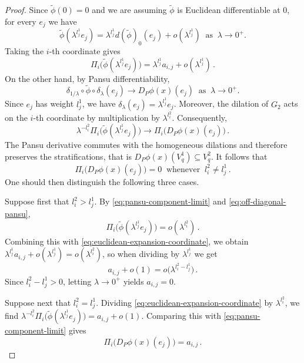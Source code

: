 \documentclass[dvipsnames]{amsart}
\theoremstyle{definition}
\theoremstyle{definition}
\numberwithin{equation}{section}
\begin{document}
\begin{proof}
Since $\widetilde\phi(0)=0$ and we are assuming \(\widetilde\phi\) is Euclidean differentiable at \(0\), for every
\(e_j\) we have
\[
\widetilde\phi(\lambda^{l_j^1}e_j)
=
\lambda^{l_j^1}d(\widetilde\phi)_0(e_j)
+
o(\lambda^{l_j^1})
\ \text{ as }\ \lambda\to0^+.
\]
Taking the \(i\)-th coordinate gives
\begin{equation}
\label{eq:euclidean-expansion-coordinate}
\Pi_i\bigl(\widetilde\phi(\lambda^{l_j^1}e_j)\bigr)
=
\lambda^{l_j^1}a_{i,j}
+
o(\lambda^{l_j^1})\,.
\end{equation}
On the other hand, by Pansu differentiability,
\[
\delta_{1/\lambda}\circ\widetilde\phi\circ\delta_\lambda(e_j)
\longrightarrow
D_P\phi(x)(e_j)\ 
\text{ as }\ \lambda\to0^+.
\]
Since \(e_j\) has weight \(l_j^1\), we have $\delta_\lambda(e_j)=\lambda^{l_j^1}e_j$.
Moreover, the dilation of \(G_2\) acts on the \(i\)-th coordinate by
multiplication by \(\lambda^{l_i^2}\). Consequently,
\begin{equation}
\label{eq:pansu-component-limit}
\lambda^{-l_i^2}
\Pi_i\bigl(\widetilde\phi(\lambda^{l_j^1}e_j)\bigr)
\longrightarrow
\Pi_i\bigl(D_P\phi(x)(e_j)\bigr)\,.
\end{equation}
The Pansu derivative commutes with the homogeneous dilations and
therefore preserves the stratifications, that is $D_P\phi(x)(V_q^1)\subseteq V_q^2$.
It follows that
\begin{equation}
\label{eq:off-diagonal-pansu}
\Pi_i\bigl(D_P\phi(x)(e_j)\bigr)=0
\ \text{ whenever }\ 
l_i^2\neq l_j^1\,.
\end{equation}
One should then distinguish the following three cases.

Suppose first that \(l_i^2>l_j^1\). By
\eqref{eq:pansu-component-limit} and
\eqref{eq:off-diagonal-pansu},
\[
\Pi_i\bigl(\widetilde\phi(\lambda^{l_j^1}e_j)\bigr)
=
o(\lambda^{l_i^2})\,.
\]
Combining this with
\eqref{eq:euclidean-expansion-coordinate}, we obtain $\lambda^{l_j^1}a_{i,j}+o(\lambda^{l_j^1})
=
o(\lambda^{l_i^2})$, so when
dividing by \(\lambda^{l_j^1}\) we get
\[
a_{i,j}+o(1)
=
o\bigl(\lambda^{l_i^2-l_j^1}\bigr)\,.
\]
Since \(l_i^2-l_j^1>0\), letting \(\lambda\to0^+\) yields $a_{i,j}=0$.

Suppose next that \(l_i^2=l_j^1\). Dividing
\eqref{eq:euclidean-expansion-coordinate} by \(\lambda^{l_i^2}\), we find $
\lambda^{-l_i^2}
\Pi_i\bigl(\widetilde\phi(\lambda^{l_j^1}e_j)\bigr)
=
a_{i,j}+o(1)$.
Comparing this with \eqref{eq:pansu-component-limit} gives
\[
\Pi_i\bigl(D_P\phi(x)(e_j)\bigr)=a_{i,j}\,.
\]


\end{proof}
\end{document}
